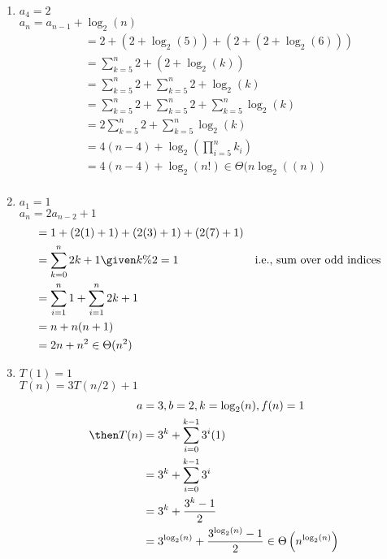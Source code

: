 \documentclass[basic, header]{nosvagor-notes}
\begin{document}
\begin{enumerate}[itemsep=4em]
\begin{enumerate}[itemsep=2em]
      \item $a_4 = 2$\\
        $a_n = a_{n-1} + \log_2(n)$
        \begin{align*}
          &= 2 + \left( 2 + \log_2(5) \right) + \left( 2 + \left( 2 + \log_2(6) \right)  \right) \\
          &= \sum_{k=5}^{n} 2+ (2 + \log_2(k)) \\
          &= \sum_{k=5}^{n} 2 + \sum_{k=5}^{n} 2 + \log_2(k) \\
          &= \sum_{k=5}^{n} 2 + \sum_{k=5}^{n} 2 + \sum_{k=5}^{n} \log_2(k)\\
          &= 2\sum_{k=5}^{n} 2 + \sum_{k=5}^{n} \log_2(k)\\
          &= 4(n-4) + \log_2\left(\prod_{i=5}^{n} k_i\right) \\
          &= 4(n-4) + \log_2(n!) \in \Theta(n \log_2((n))\\
        \end{align*}

      \item $a_1 = 1$\\
        $a_n = 2a_{n-2} + 1$
        \begin{align*}
          &= 1 + (2(1) + 1) + (2(3) + 1) + (2(7) + 1) \\
          &= \sum_{k=0}^{n} 2k + 1 \given k\%2 = 1 &&\text{i.e., sum over odd indices}\\
          &= \sum_{i=1}^{n} 1 + \sum_{i=1}^{n} 2k+1 \\
          &= n + n(n+1) \\
          &= 2n + n^2 \in \Theta(n^2)
        \end{align*}

      \item $T(1) = 1$\\
        $T(n) = 3T(n/2) + 1$
        \begin{align*}
          a &= 3, b = 2, k = \log_2(n), f(n) = 1 \\
          \then T(n) &= 3^k + \sum_{i=0}^{k-1} 3^i (1) \\
               &= 3^k + \sum_{i=0}^{k-1} 3^i \\
               &= 3^k + \frac{3^k - 1}{2} \\
               &= 3^{\log_2(n)}  + \frac{3^{\log_2(n)} -1}{2} \in \Theta\left(n^{\log_2(n)} \right)
        \end{align*}


\end{enumerate}
\end{enumerate}
\end{document}
